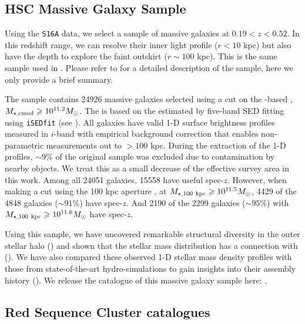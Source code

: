 \documentclass[fleqn,usenatbib,useAMS]{mnras}
\begin{document}
\begin{CJK*}{UTF8}{gbsn}
\subsection{HSC Massive Galaxy Sample}
    \label{sec:galaxy_sample}

    Using the \texttt{S16A} data, we select a sample of massive galaxies at $0.19 < z < 0.52$.
    In this redshift range, we can resolve their inner light profile ($r<10$ kpc) but also have the
    depth to explore the faint outskirt ($r \sim 100$ kpc).
    This is the same sample used in \citet{Huang2020}. Please refer to \citet{Huang2020} for a 
    detailed description of the sample, here we only provide a brief summary.

    The sample contains 24926 massive galaxies selected using a cut on the \cmodel{}-based 
    \mstar{}, $M_{\star,\mathrm{cmod}}{} \geqslant 10^{11.2} M_{\odot}$.
    The \mcmodel{} is based on the \mlratio{} estimated by five-band SED fitting using
    \texttt{iSEDfit} (see \citealt{Moustakas2013}).
    All galaxies have valid 1-D surface brightness profiles measured in $i$-band with empirical
    background correction that enables non-parametric \mstar{} measurements out to $>100$ kpc.
    During the extraction of the 1-D profiles, $\sim 9$\% of the original sample was excluded 
    due to contamination by nearby objects. 
    We treat this as a small decrease of the effective survey area in this work.
    Among all 24051 galaxies, 15558 have useful spec-$z$.
    However, when making a cut using the 100 kpc aperture \mstar{}, at $M_{\star, {100}\ \rm kpc} \geqslant 10^{11.5}
    M_{\odot}$, 4429 of the 4848 galaxies ($\sim 91$\%) have spec-$z$.
    And 2190 of the 2299 galaxies ($\sim 95$\%) with $M_{\star, {100}\ \rm kpc} \geqslant 10^{11.6} M_{\odot}$ have
    spec-$z$.

    Using this sample, we have uncovered remarkable structural diversity in the outer stellar halo
    (\citealt{Huang2018b}) and shown that the stellar mass distribution has a connection with
    \mvir{} (\citealt{Huang2018c, Huang2020}).
    We have also compared these observed 1-D stellar mass density profiles with those from
    state-of-the-art hydro-simulations to gain insights into their assembly history
    (\citealt{Ardila2021}).
    We release the catalogue of this massive galaxy sample here:
    \href{https://zenodo.org/record/4902141}{\faDatabase}.

\subsection{Red Sequence Cluster catalogues}
    \label{sec:cluster_sample}


\end{CJK*}
\end{document}
